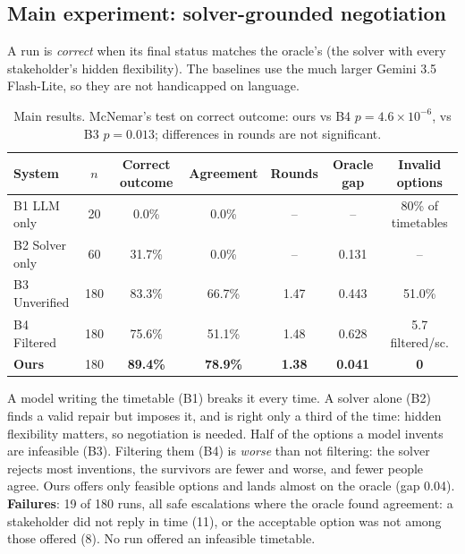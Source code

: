 \documentclass[11pt,a4paper]{article}
\newcommand{\best}[1]{\textbf{#1}}
\begin{document}
\subsection{Main experiment: solver-grounded negotiation}
\label{sec:eval-main}
A run is \emph{correct} when its final status matches the oracle's (the solver with every stakeholder's hidden
flexibility). The baselines use the much larger Gemini 3.5 Flash-Lite, so they are not handicapped on
language.

\begin{table}[H]
\centering\small
\begin{tabularx}{\textwidth}{@{}l c C C C C C@{}}
\toprule
\textbf{System} & \textbf{$n$} & \textbf{Correct outcome} & \textbf{Agreement} & \textbf{Rounds} & \textbf{Oracle gap} & \textbf{Invalid options}\\
\midrule
B1 LLM only & 20 & 0.0\% & 0.0\% & -- & -- & 80\% of timetables\\
B2 Solver only & 60 & 31.7\% & 0.0\% & -- & 0.131 & --\\
B3 Unverified & 180 & 83.3\% & 66.7\% & 1.47 & 0.443 & 51.0\%\\
B4 Filtered & 180 & 75.6\% & 51.1\% & 1.48 & 0.628 & 5.7 filtered/sc.\\
\textbf{Ours} & 180 & \best{89.4\%} & \best{78.9\%} & \best{1.38} & \best{0.041} & \best{0}\\
\bottomrule
\end{tabularx}
\caption{Main results. McNemar's test on correct outcome: ours vs B4 $p=4.6\times10^{-6}$, vs B3
$p=0.013$; differences in rounds are not significant.}
\label{tab:main}
\end{table}

\noindent A model writing the timetable (B1) breaks it every time. A solver alone (B2) finds a valid repair but
imposes it, and is right only a third of the time: hidden flexibility matters, so negotiation is needed. Half of the
options a model invents are infeasible (B3). Filtering them (B4) is \emph{worse} than not filtering: the solver
rejects most inventions, the survivors are fewer and worse, and fewer people agree. Ours offers only feasible
options and lands almost on the oracle (gap 0.04). \textbf{Failures}: 19 of 180 runs, all safe escalations where the
oracle found agreement: a stakeholder did not reply in time (11), or the acceptable option was not among those
offered (8). No run offered an infeasible timetable.
\end{document}
